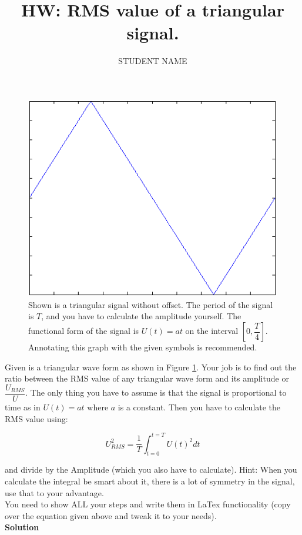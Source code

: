 \documentclass[11pt,letterpaper]{article}
\author{STUDENT NAME}
\title{HW: RMS value of a triangular signal.}
\begin{document}
\maketitle

\begin{figure}
\centering
\includegraphics[width=0.8\linewidth]{TriangularWaveSignal}
\caption{Shown is a triangular signal without offset. The period of the signal is $T$, and you have to calculate the amplitude yourself. The functional form of the signal is $U(t) = at$ on the interval $[0, \dfrac{T}{4}]$. Annotating this graph with the given symbols is recommended.}
\label{fig:TriangularWaveSignal}
\end{figure}

Given is a triangular wave form as shown in Figure \ref{fig:TriangularWaveSignal}. Your job is to find out the ratio between the RMS value of any triangular wave form and its amplitude or $\dfrac{U_{RMS}}{U}$. The only thing you have to assume is that the signal is proportional to time as in $U(t) = at$ where $a$ is a constant. Then you have to calculate the RMS value using:

\begin{equation} \label{Eqn:ICE_RMS_Triangle_KEY1}
U_{RMS}^2=\dfrac{1}{T}\int_{t=0}^{t=T} U(t)^2 dt
\end{equation}

and divide by the Amplitude (which you also have to calculate). Hint: When you calculate the integral be smart about it, there is a lot of  symmetry in the signal, use that to your advantage.\\

You need to show ALL your steps and write them in LaTex functionality (copy over the equation given above and tweak it to your needs).\\

\textbf{Solution}\\
\end{document}
